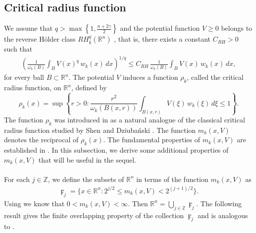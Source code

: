 \documentclass[11pt, reqno]{amsproc}
\theoremstyle{definition}
\theoremstyle{remark}
\numberwithin{equation}{section}
\begin{document}
\subsection{Critical radius function}
We assume that \(q>\max\left\{1,\frac{n+2\gamma}{2}\right\}\) and the potential function $V\geq 0$ belongs to the reverse H\"older class $RH_k^q(\mathbb{R}^n)$ \cite{Hejna-2021}, that is, there exists a constant \(C_{RH}>0\) such that
\begin{align} \label{RVC}
\left( \frac{1}{\omega_k(B)} \int_B V(x)^q\, w_k(x)\,dx \right)^{1/q}
\leq C_{RH}\, \frac{1}{\omega_k(B)} \int_B V(x)\, w_k(x)\,dx,
\end{align}
for every ball \(B \subset \mathbb{R}^n\).  
The potential \(V\) induces a function \(\rho_k\), called the critical radius function, on \(\mathbb{R}^n\), defined by
\[
\rho_k(x)
=
\sup \left\{
r>0:
\frac{r^2}{\omega_k(B(x,r))}
\int_{B(x,r)} V(\xi)\,w_k(\xi)\,d\xi
\le 1
\right\}.
\]
The function \(\rho_k\) was introduced in \cite{Hejna-2021} as a natural analogue of the classical critical radius function studied by Shen \cite{Shen-1995} and Dziuba\'nski \cite{Dziubanski-2005}. The function \(m_k(x,V)\) denotes the reciprocal of \(\rho_k(x)\).
The fundamental properties of \(m_k(x,V)\) are established in \cite{Hejna-2021}. In this subsection, we derive some additional properties of \(m_k(x,V)\) that will be useful in the sequel.
\\ \\
For each $j\in \mathbb{Z}$, we define the subsets of $\mathbb{R}^n$ in terms of the function $m_k(x,V)$ as
\begin{align*}
    {\digamma}_j = \{x\in \mathbb{R}^n: 2^{j/2} \leq m_k(x,V) < 2^{(j+1)/2} \}. 
\end{align*}Using \cite[Lemma 7]{Hejna-2021} we know that $0< m_k(x,V)< \infty$. Then $\mathbb{R}^n=\bigcup\limits_{j\in \mathbb{Z}} \digamma_j$. The following result gives the finite overlapping property of the collection $\digamma_j$ and is analogous to \cite[Lemma 2]{Dziubanski-1999}.
\end{document}
